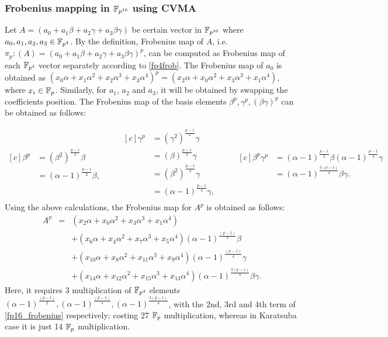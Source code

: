 \subsubsection{Frobenius mapping in \texorpdfstring{$\mathbb{F}_{p^{16}}$}{} using CVMA}\label{fobenius_map}
Let $A=(a_0+a_1\beta+a_2\gamma+a_3\beta \gamma)$ be certain vector in $\mathbb{F}_{p^{16}}$ where $a_0,a_1,a_2, a_3 \in \mathbb{F}_{p^4}$.
By the definition, Frobenius map of $A$, i.e. $\pi_p : (A) = (a_0+a_1\beta+a_2\gamma+a_3\beta \gamma)^p$, can be computed as Frobenius map of each $\mathbb{F}_{p^4}$ vector separately according to \eqref{fp4frob}. 
The Frobenius map of $a_0$  is obtained as $(x_0\alpha+ x_1\alpha^2 + x_2\alpha^3 +x_3\alpha^4)^p = (x_2\alpha+ x_0\alpha^2 + x_3\alpha^3 +x_1\alpha^4)$, where $x_i \in \mathbb{F}_p$.
Similarly, for $a_1$, $a_2$ and $a_3$, it  will be obtained by swapping the coefficients position.
The Frobenius map of the basis elements $\beta^p, \gamma^p, (\beta\gamma)^p$ can be obtained as follows:

\begin{equation*}
\begin{aligned}[c]
\beta^p&=(\beta^2)^{\frac{p-1}{2}}\beta \\
 &=(\alpha-1)^{\frac{p-1}{2}}\beta,
\end{aligned}
\qquad
\begin{aligned}[c]
\gamma^p&=(\gamma^2)^{\frac{p-1}{2}}\gamma \nonumber \\
&=(\beta)^{\frac{p-1}{2}}\gamma \nonumber \\
&=(\beta^2)^{\frac{p-1}{4}}\gamma \nonumber \\
&=(\alpha-1)^{\frac{p-1}{4}}\gamma, \nonumber \\
\end{aligned}
\qquad 
\begin{aligned}[c]
\beta^p \gamma^p &= (\alpha-1)^{\frac{p-1}{2}}\beta (\alpha-1)^{\frac{p-1}{4}}\gamma \nonumber \\
&=(\alpha-1)^{\frac{3(p-1)}{4}} \beta \gamma. \nonumber 
\end{aligned}
\end{equation*}
Using the above calculations, the Frobenius map for $A^p$ is obtained as follows:
\begin{eqnarray}\label{fp16_frobenius}
A^p &=&  ( x_2 \alpha+x_0 \alpha^2+ x_3 \alpha^3+x_1\alpha^4) \nonumber \\
&& + ( x_6 \alpha+x_4 \alpha^2+ x_7 \alpha^3+x_5\alpha^4)(\alpha-1)^{\frac{(p-1)}{2}}\beta \nonumber \\
& & +  ( x_{10} \alpha+x_8 \alpha^2+ x_{11} \alpha^3+x_9\alpha^4)(\alpha-1)^{\frac{(p-1)}{4}}\gamma \nonumber \\
&&+ ( x_{14} \alpha+x_{12} \alpha^2+ x_{15} \alpha^3+x_{13}\alpha^4)(\alpha-1)^{\frac{3(p-1)}{4}}\beta \gamma.
\end{eqnarray}
 Here, it requires 3 multiplication of $\mathbb{F}_{p^4}$ elements $(\alpha-1)^{\frac{(p-1)}{2}}, (\alpha-1)^{\frac{(p-1)}{4}}, (\alpha-1)^{\frac{3(p-1)}{4}}$, with the 2nd, 3rd and 4th term of \eqref{fp16_frobenius} respectively; costing 27 ${\mathbb{F}}_{p}$ multiplication, whereas in Karatsuba case it is just 14 ${\mathbb{F}}_{p}$ multiplication.


